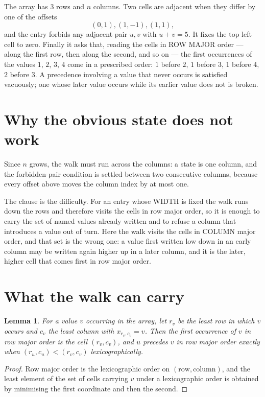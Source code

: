 \documentclass[11pt,a4paper]{article}
\theoremstyle{plain}
\newtheorem{lemma}[theorem]{Lemma}
\theoremstyle{definition}
\begin{document}
The array has $3$ rows and $n$ columns. Two cells are adjacent when they differ by one of the
offsets
\[
(0,1), (1,-1), (1,1),
\]
and the entry forbids any adjacent pair $u,v$ with $u+v=5$. It fixes the top left cell to
zero. Finally it asks that, reading the cells in ROW MAJOR order --- along the first row, then
along the second, and so on --- the first occurrences of the values $1$, $2$, $3$, $4$ come in a
prescribed order: $1$ before $2$, $1$ before $3$, $1$ before $4$, $2$ before $3$. A precedence involving a value that never occurs is satisfied
vacuously; one whose later value occurs while its earlier value does not is broken.

\section{Why the obvious state does not work}

Since $n$ grows, the walk must run across the columns: a state is one column, and the
forbidden-pair condition is settled between two consecutive columns, because every offset above
moves the column index by at most one.

The clause is the difficulty. For an entry whose WIDTH is fixed the walk runs down the rows and
therefore visits the cells in row major order, so it is enough to carry the set of named values
already written and to refuse a column that introduces a value out of turn. Here the walk
visits the cells in COLUMN major order, and that set is the wrong one: a value first written
low down in an early column may be written again higher up in a later column, and it is the
later, higher cell that comes first in row major order.

\section{What the walk can carry}

\begin{lemma}\label{lem:key}
For a value $v$ occurring in the array, let $r_v$ be the least row in which $v$ occurs and
$c_v$ the least column with $x_{r_v,c_v}=v$. Then the first occurrence of $v$ in row major
order is the cell $(r_v,c_v)$, and $u$ precedes $v$ in row major order exactly when
$(r_u,c_u)<(r_v,c_v)$ lexicographically.
\end{lemma}

\begin{proof}
Row major order is the lexicographic order on $(\text{row},\text{column})$, and the least
element of the set of cells carrying $v$ under a lexicographic order is obtained by minimising
the first coordinate and then the second.
\end{proof}
\end{document}
